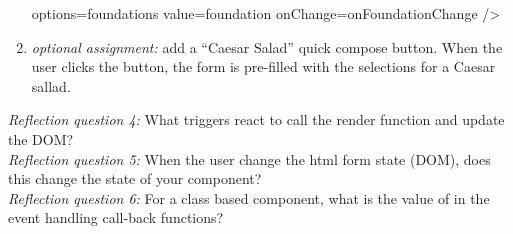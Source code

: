 \documentclass[fleqn, article, a4paper]{memoir}
\begin{document}
\begin{Assignments}
\begin{enumerate}
\begin{Code}
      options={foundations}
      value={foundation}
      onChange={onFoundationChange}
  />
  \end{Code}
  \item \emph{optional assignment:} add a ``Caesar Salad'' quick compose button. When the user clicks the button, the form is pre-filled with the selections for a Caesar sallad.
\end{enumerate}
\emph{Reflection question 4:} What triggers react to call the render function and update the DOM?
\\\emph{Reflection question 5:} When the user change the html form state (DOM), does this change the state of your component?
\\\emph{Reflection question 6:} For a class based component, what is the value of  in the event handling call-back functions?


\end{Assignments}
\end{document}
